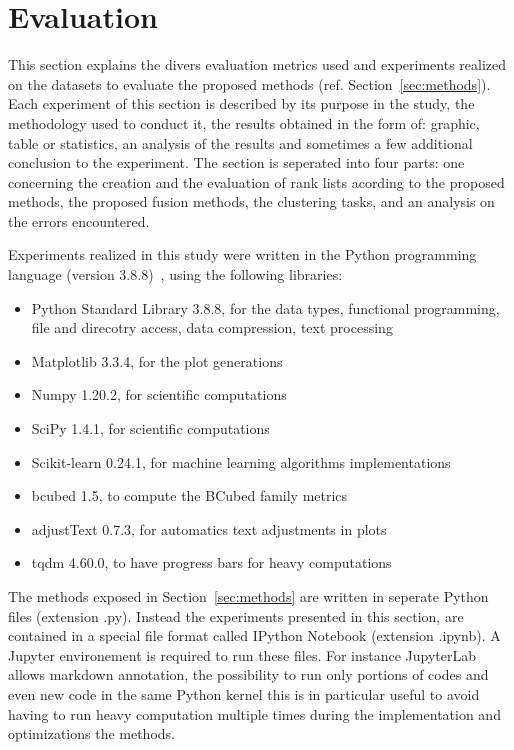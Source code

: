 \section{Evaluation \label{sec:evaluation}}

This section explains the divers evaluation metrics used and experiments realized on the datasets to evaluate the proposed methods (ref. Section~\ref{sec:methods}).
Each experiment of this section is described by its purpose in the study, the methodology used to conduct it, the results obtained in the form of: graphic, table or statistics, an analysis of the results and sometimes a few additional conclusion to the experiment.
The section is seperated into four parts: one concerning the creation and the evaluation of rank lists acording to the proposed methods, the proposed fusion methods, the clustering tasks, and an analysis on the errors encountered.

Experiments realized in this study were written in the Python programming language (version 3.8.8)~\cite{python}, using the following libraries:
\begin{itemize}
  \item Python Standard Library 3.8.8, for the data types, functional programming, file and direcotry access, data compression, text processing~\cite{python_standard_library}
  \item Matplotlib 3.3.4, for the plot generations~\cite{matplotlib}
  \item Numpy 1.20.2, for scientific computations~\cite{numpy}
  \item SciPy 1.4.1, for scientific computations~\cite{scipy}
  \item Scikit-learn 0.24.1, for machine learning algorithms implementations~\cite{sklearn}
  \item bcubed 1.5, to compute the BCubed family metrics~\cite{bcubed_gh}
  \item adjustText 0.7.3, for automatics text adjustments in plots~\cite{adjustText}
  \item tqdm 4.60.0, to have progress bars for heavy computations~\cite{tqdm}
\end{itemize}
The methods exposed in Section~\ref{sec:methods} are written in seperate Python files (extension .py).
Instead the experiments presented in this section, are contained in a special file format called IPython Notebook (extension .ipynb).
A Jupyter environement is required to run these files.
For instance JupyterLab allows markdown annotation, the possibility to run only portions of codes and even new code in the same Python kernel this is in particular useful to avoid having to run heavy computation multiple times during the implementation and optimizations the methods.







